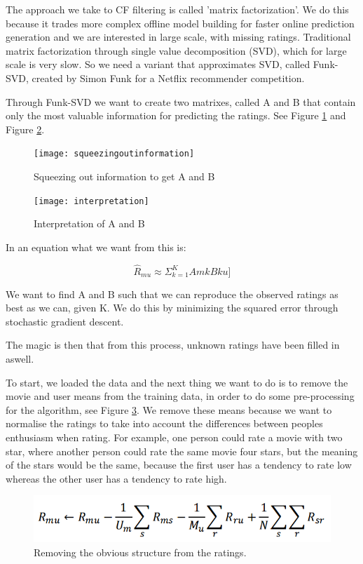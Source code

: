 	The approach we take to CF filtering is called 'matrix factorization'.
	We do this because it trades more complex offline model building for faster online prediction
	generation and we are interested in large scale, with missing ratings.
	Traditional matrix factorization through single value decomposition (SVD), which for large scale is very slow.
	So we need a variant that approximates SVD, called Funk-SVD, created by Simon Funk for a Netflix recommender competition.
	
	Through Funk-SVD we want to create two matrixes, called A and B that contain only the most valuable information for predicting the ratings. See Figure \ref{fig:squeeze} and Figure \ref{fig:interpretation}.
	
	\begin{figure}[h]
		\centering
		\texttt{[image: squeezingoutinformation]}
		\caption{Squeezing out information to get A and B}\label{fig:squeeze}
	\end{figure}
	
	\begin{figure}[h]
		\centering
		\texttt{[image: interpretation]}
		\caption{Interpretation of A and B}\label{fig:interpretation}
	\end{figure}
	
	In an equation what we want from this is:
	
	$$\hat{R}_{mu} \approx \Sigma_{k=1}^K A{mk} B{ku}]$$
	
	We want to find A and B such that we can reproduce the observed ratings as best as we can, given K. 
	We do this by minimizing the squared error through stochastic gradient descent.
	
	The magic is then that from this process, unknown ratings have been filled in aswell.
	
	To start, we loaded the data and the next thing we want to do is to remove the movie and user means from the training data, in order to do some pre-processing for the algorithm, see Figure \ref{fig:obv}. 
	We remove these means because we want to normalise the ratings to take into account the differences between peoples enthusiasm when rating. For example, one person could rate a movie with two star, where another person could rate the same movie four stars, but the meaning of the stars would be the same, because the first user has a tendency to rate low whereas the other user has a tendency to rate high.
	
	\begin{figure}[h]
		\centering
		\includegraphics[scale=0.5]{obviousstructure}
		\caption{Removing the obvious structure from the ratings.}\label{fig:obv}
	\end{figure}
	
